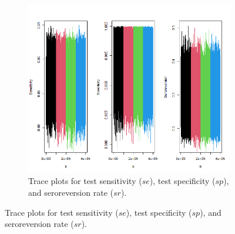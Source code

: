\captionsetup[subfigure]{labelformat=empty}
\begin{figure}[ht!]
\centering
\begin{subfigure}[b]{\columnwidth} 
    \includegraphics[width=\columnwidth]{../../plot/trace_global.png}
    \caption{Trace plots for test sensitivity ($se$), test specificity ($sp$), and seroreversion rate ($sr$).}
    \label{fig:global_trace}
\end{subfigure}
\end{figure}